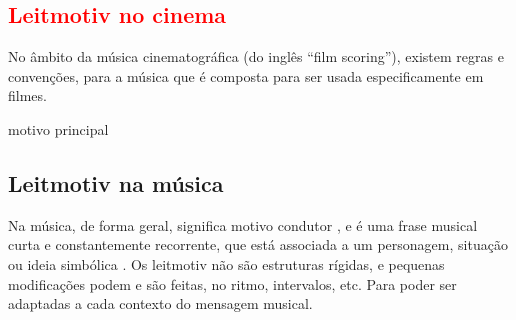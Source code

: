 \subsection{\textcolor{red}{Leitmotiv no cinema}}

No âmbito da música cinematográfica (do inglês ``film scoring''),
existem regras e convenções, para a música que é composta para 
ser usada especificamente em filmes.
\begin{comment}
Assim, o sistema cinematográfico clássico é generalizado pelos 
estudiosos do cinema em duas concepções \cite[pp. 121]{powrie2006changing}:
\begin{itemize}
\item A visão de que o espectador é um sujeito autônomo que percebe 
e procura ver detalhes dramaticamente importantes,
que deem lugar a uma postura anti-idealista em que o espectador está 
posicionado dentro de uma ideologia psíquica \cite[pp. 121]{powrie2006changing}.
\item A visão que os filmes de Hollywood trabalham com o objetivo 
de articular a história dentro de um discurso invisível \cite[pp. 121]{powrie2006changing}.
\end{itemize}
\end{comment}

motivo principal \cite[pp. 7]{bribitzer2015understanding} 

\subsection{Leitmotiv na música}



Na música, de forma geral,
significa motivo condutor \cite[pp. 230]{holst1998abc} \cite[pp. 465]{apel1969harvard}, 
e é uma frase musical curta e constantemente recorrente, 
que está associada a um personagem, situação ou ideia simbólica \cite[pp. 230]{holst1998abc}.
Os leitmotiv não são estruturas rígidas, e pequenas modificações podem e são feitas,
no ritmo, intervalos,  \cite[pp. 466]{apel1969harvard}
\cite[pp. 465]{apel1969harvard} etc. Para poder ser adaptadas a cada contexto do mensagem musical.

